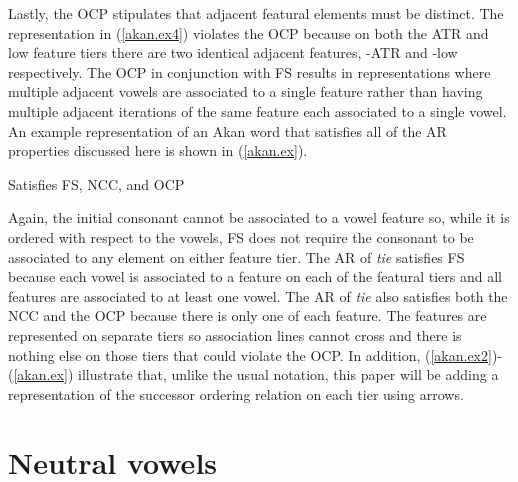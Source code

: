 \documentclass[,doc,floatsintext]{apa6}
\theoremstyle{definition}
\theoremstyle{definition}
\theoremstyle{definition}
\theoremstyle{remark}
\begin{document}
Lastly, the OCP stipulates that adjacent featural elements must be
distinct. The representation in (\ref{akan.ex4}) violates the OCP
because on both the ATR and low feature tiers there are two identical
adjacent features, -ATR and -low respectively. The OCP in conjunction
with FS results in representations where multiple adjacent vowels are
associated to a single feature rather than having multiple adjacent
iterations of the same feature each associated to a single vowel. An
example representation of an Akan word that satisfies all of the AR
properties discussed here is shown in (\ref{akan.ex}).

\begin{exe}
\ex \label{akan.ex} Satisfies FS, NCC, and OCP
\end{exe}

Again, the initial consonant cannot be associated to a vowel feature so,
while it is ordered with respect to the vowels, FS does not require the
consonant to be associated to any element on either feature tier. The AR
of \emph{tie} satisfies FS because each vowel is associated to a feature
on each of the featural tiers and all features are associated to at
least one vowel. The AR of \emph{tie} also satisfies both the NCC and
the OCP because there is only one of each feature. The features are
represented on separate tiers so association lines cannot cross and
there is nothing else on those tiers that could violate the OCP. In
addition, (\ref{akan.ex2})-(\ref{akan.ex}) illustrate that, unlike the
usual notation, this paper will be adding a representation of the
successor ordering relation on each tier using arrows.

\section{Neutral vowels}\label{neutral-vowels}
\end{document}
